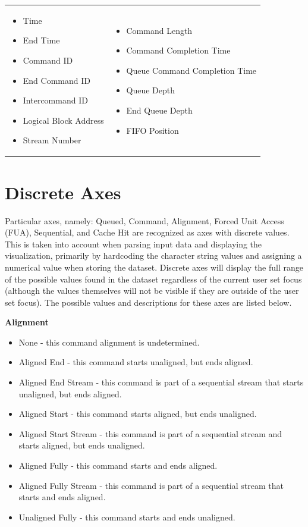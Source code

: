\documentclass[12pt]{ucthesis}
\begin{document}
\begin{tabular}{p{}p{}}
\begin{itemize}
\item Time
\item End Time
\item Command ID
\item End Command ID
\item Intercommand ID
\item Logical Block Address
\item Stream Number
\end{itemize}
&
\begin{itemize}
\item Command Length
\item Command Completion Time
\item Queue Command Completion Time
\item Queue Depth
\item End Queue Depth
\item FIFO Position
\end{itemize}
\end{tabular}

\section{Discrete Axes}
Particular axes, namely: Queued, Command, Alignment, Forced Unit Access (FUA), Sequential, and Cache Hit are recognized as axes with discrete values. This is taken into account when parsing input data and displaying the visualization, primarily by hardcoding the character string values and assigning a numerical value when storing the dataset. Discrete axes will display the full range of the possible values found in the dataset regardless of the current user set focus (although the values themselves will not be visible if they are outside of the user set focus). The possible values and descriptions for these axes are listed below.

\noindent \textbf{Alignment}
\begin{itemize}
\item None - this command alignment is undetermined.
\item Aligned End - this command starts unaligned, but ends aligned.
\item Aligned End Stream - this command is part of a sequential stream that starts unaligned, but ends aligned.
\item Aligned Start - this command starts aligned, but ends unaligned.
\item Aligned Start Stream - this command is part of a sequential stream and starts aligned, but ends unaligned.
\item Aligned Fully - this command starts and ends aligned.
\item Aligned Fully Stream - this command is part of a sequential stream that starts and ends aligned.
\item Unaligned Fully - this command starts and ends unaligned.
\end{itemize}
\end{document}
